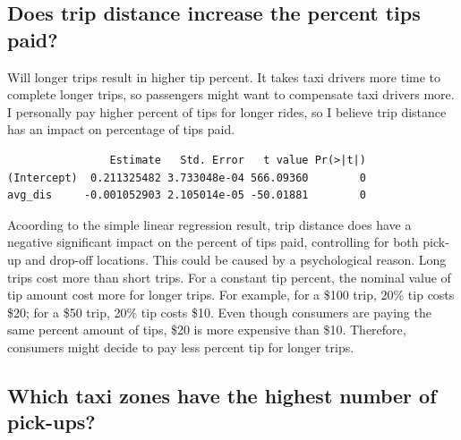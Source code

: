 \documentclass[12pt,twoside]{reedthesis}
\theoremstyle{definition}
\theoremstyle{definition}
\theoremstyle{definition}
\theoremstyle{remark}
\begin{document}
\subsection{Does trip distance increase the percent tips
paid?}\label{does-trip-distance-increase-the-percent-tips-paid}

Will longer trips result in higher tip percent. It takes taxi drivers
more time to complete longer trips, so passengers might want to
compensate taxi drivers more. I personally pay higher percent of tips
for longer rides, so I believe trip distance has an impact on percentage
of tips paid.
\begin{verbatim}
                Estimate   Std. Error   t value Pr(>|t|)
(Intercept)  0.211325482 3.733048e-04 566.09360        0
avg_dis     -0.001052903 2.105014e-05 -50.01881        0
\end{verbatim}
Acoording to the simple linear regression result, trip distance does
have a negative significant impact on the percent of tips paid,
controlling for both pick-up and drop-off locations. This could be
caused by a psychological reason. Long trips cost more than short trips.
For a constant tip percent, the nominal value of tip amount cost more
for longer trips. For example, for a \$100 trip, 20\% tip costs \$20;
for a \$50 trip, 20\% tip costs \$10. Even though consumers are paying
the same percent amount of tips, \$20 is more expensive than \$10.
Therefore, consumers might decide to pay less percent tip for longer
trips.

\subsection{Which taxi zones have the highest number of
pick-ups?}\label{which-taxi-zones-have-the-highest-number-of-pick-ups}
\end{document}
